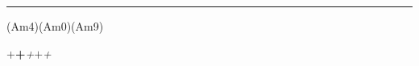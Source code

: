 \def\slash{\hbox{/}}%
\def\passBass{\noactivenumerals\setformatC\slash\catcode`/=9\catcode`(=15}
\def\Beginexp{%
\noactivenumerals$^\bgroup\catcode`/=12\catcode`(=15%
\setformatB\aftergroup\endexp%
}
\def\endexp{$\kern-.2em\passBass}
\def\setformatA{\bf} 
\def\setformatB{\fam=6}
\def\setformatC{\tenrm}
\def\fixchordspace{0.5em}  %
\def\pluschordspace{0.5em} %
\def\chordraise{2.1ex}     %
\def\chordinshypen{%
  \divide\dimen0 by 2%
  \ifdim\dimen0<0.3em\dimen0=0.3em\else\fi%
  \hskip\dimen0 plus 1em{-}\hskip\dimen0 plus 1em%
}  
\def\chordinsspace{%
  \unskip%
  \ifdim\dimen0>3em{%
    \advance\dimen0 by -1.5em%
    \hskip.75em\leaders\hbox{--}\hskip\dimen0 plus 1em\hskip.75em%
  }%
  \else{\hskip\dimen0 plus 1em}%
  \fi%
}
\def\typechord{%
  \dimen0=\wd\lastchord%
  \advance\dimen0 by \fixchordspace%
  \dimen1=\dimen0%
  \advance\dimen0 by -\wd\lasttext%
  \wd\lastchord=0pt%
  \raise\chordraise\box\lastchord%
  \ifdim\dimen0<0pt{\unhbox\lasttext}%
   \else{%
      \setbox0=\hbox to \dimen1{\unhbox\lasttext}%
      \ifnum\badness<250{\box0}%
      \else{\unhbox0%
         \advance\dimen0 by \pluschordspace%
         \ifdim\lastskip=0.0pt{\chordinshypen}%
         \else{\chordinsspace}%
         \fi%
      }\fi%
   }\fi%
}  





\hrule
\beglyric%
%
%
(Am4)(Am0)(Am9)

\endlyric

{\rm +}{\bf +}{\it +}{$+$}{\sl +}
\bye



